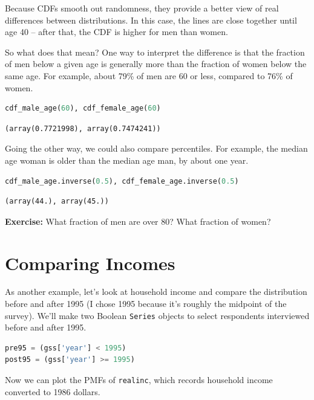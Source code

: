 Because CDFs smooth out randomness, they provide a better view of real
differences between distributions. In this case, the lines are close
together until age 40 -- after that, the CDF is higher for men than
women.

So what does that mean? One way to interpret the difference is that the
fraction of men below a given age is generally more than the fraction of
women below the same age. For example, about 79\% of men are 60 or less,
compared to 76\% of women.

\begin{lstlisting}[language=Python,style=source]
cdf_male_age(60), cdf_female_age(60)
\end{lstlisting}

\begin{lstlisting}[style=output]
(array(0.7721998), array(0.7474241))
\end{lstlisting}

Going the other way, we could also compare percentiles. For example, the
median age woman is older than the median age man, by about one year.

\begin{lstlisting}[language=Python,style=source]
cdf_male_age.inverse(0.5), cdf_female_age.inverse(0.5)
\end{lstlisting}

\begin{lstlisting}[style=output]
(array(44.), array(45.))
\end{lstlisting}

\textbf{Exercise:} What fraction of men are over 80? What fraction of
women?

\section{Comparing Incomes}\label{comparing-incomes}

As another example, let's look at household income and compare the
distribution before and after 1995 (I chose 1995 because it's roughly
the midpoint of the survey). We'll make two Boolean
\passthrough{\lstinline!Series!} objects to select respondents
interviewed before and after 1995.

\begin{lstlisting}[language=Python,style=source]
pre95 = (gss['year'] < 1995)
post95 = (gss['year'] >= 1995)
\end{lstlisting}

Now we can plot the PMFs of \passthrough{\lstinline!realinc!}, which
records household income converted to 1986 dollars.


